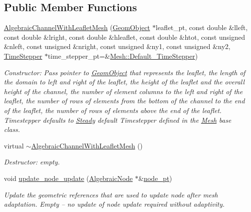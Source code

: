 \subsection*{Public Member Functions}
\begin{DoxyCompactItemize}
\item 
\hyperlink{classoomph_1_1AlgebraicChannelWithLeafletMesh_a1e72e11c9971ed132efc95b808c83ccd}{Algebraic\+Channel\+With\+Leaflet\+Mesh} (\hyperlink{classoomph_1_1GeomObject}{Geom\+Object} $\ast$leaflet\+\_\+pt, const double \&lleft, const double \&lright, const double \&hleaflet, const double \&htot, const unsigned \&nleft, const unsigned \&nright, const unsigned \&ny1, const unsigned \&ny2, \hyperlink{classoomph_1_1TimeStepper}{Time\+Stepper} $\ast$time\+\_\+stepper\+\_\+pt=\&\hyperlink{classoomph_1_1Mesh_a12243d0fee2b1fcee729ee5a4777ea10}{Mesh\+::\+Default\+\_\+\+Time\+Stepper})
\begin{DoxyCompactList}\small\item\em Constructor\+: Pass pointer to \hyperlink{classoomph_1_1GeomObject}{Geom\+Object} that represents the leaflet, the length of the domain to left and right of the leaflet, the height of the leaflet and the overall height of the channel, the number of element columns to the left and right of the leaflet, the number of rows of elements from the bottom of the channel to the end of the leaflet, the number of rows of elements above the end of the leaflet. Timestepper defaults to \hyperlink{classoomph_1_1Steady}{Steady} default Timestepper defined in the \hyperlink{classoomph_1_1Mesh}{Mesh} base class. \end{DoxyCompactList}\item 
virtual \hyperlink{classoomph_1_1AlgebraicChannelWithLeafletMesh_a5b7c6a5f91427eae728c397b38de7c54}{$\sim$\+Algebraic\+Channel\+With\+Leaflet\+Mesh} ()
\begin{DoxyCompactList}\small\item\em Destructor\+: empty. \end{DoxyCompactList}\item 
void \hyperlink{classoomph_1_1AlgebraicChannelWithLeafletMesh_ace3a90b4e530c75bec8301e2291151eb}{update\+\_\+node\+\_\+update} (\hyperlink{classoomph_1_1AlgebraicNode}{Algebraic\+Node} $\ast$\&\hyperlink{classoomph_1_1AlgebraicMesh_aedeebbe95d2f8e67e9939cecd1be3933}{node\+\_\+pt})
\begin{DoxyCompactList}\small\item\em Update the geometric references that are used to update node after mesh adaptation. Empty -- no update of node update required without adaptivity. \end{DoxyCompactList}\item 

\end{DoxyCompactItemize}
